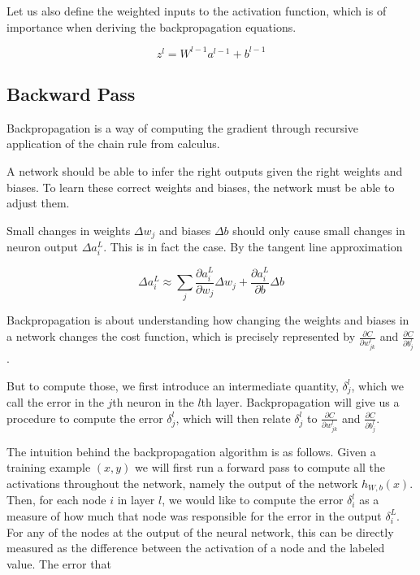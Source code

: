 Let us also define the weighted inputs to the activation function, which is of importance when deriving the backpropagation equations.

$$
z^{l} = W^{l-1}a^{l-1} + b^{l-1}
$$

\subsection{Backward Pass}
\label{subsection:backwardpass}

Backpropagation is a way of computing the gradient through recursive application of the chain rule from calculus.

A network should be able to infer the right outputs given the right weights and biases. To learn these correct weights and biases, the network must be able to adjust them.

Small changes in weights $\Delta w_j$ and biases $\Delta b$ should only cause small changes in neuron output $\Delta a^L_i$. This is in fact the case. By the tangent line approximation

$$
\Delta a^L_i \approx \sum_j \frac{\partial a^L_i}{\partial w_j} \Delta w_j + \frac{\partial a^L_i}{\partial b} \Delta b
$$

Backpropagation is about understanding how changing the weights and biases in a network changes the cost function, which is precisely represented by $\frac{\partial C}{\partial w^l_{jk}}$ and $\frac{\partial C}{\partial b^l_j}$.

But to compute those, we first introduce an intermediate quantity, $\delta^l_j$, which we call the error in the $j$th neuron in the $l$th layer. Backpropagation will give us a procedure to compute the error $\delta^l_j$, which will then relate $\delta^l_j$ to $\frac{\partial C}{\partial w^l_{jk}}$ and $\frac{\partial C}{\partial b^l_j}$.



The intuition behind the backpropagation algorithm is as follows. Given a training example $(x, y)$ we will first run a forward pass to compute all the activations throughout the network, namely the output of the network $h_{W,b}(x)$. Then, for each node $i$ in layer $l$, we would like to compute the error $\delta^{l}_i$ as a measure of how much that node was responsible for the error in the output $\delta^{L}_i$. For any of the nodes at the output of the neural network, this can be directly measured as the difference between the activation of a node and the labeled value.
The error that

